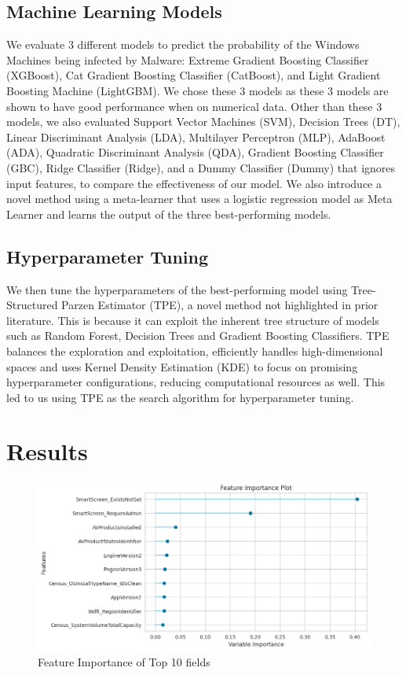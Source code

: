 \documentclass[pdflatex,sn-basic,Numbered]{sn-jnl}%
\theoremstyle{thmstyleone}%
\theoremstyle{thmstyletwo}%
\theoremstyle{thmstylethree}%
\begin{document}
\subsection{Machine Learning Models}\label{subsec:machine-learning-models}
We evaluate 3 different models to predict the probability of the Windows Machines being infected by Malware: Extreme Gradient Boosting Classifier (XGBoost), Cat Gradient Boosting Classifier (CatBoost), and Light Gradient Boosting Machine (LightGBM). We chose these 3 models as these 3 models are shown to have good performance when on numerical data.
Other than these 3 models, we also evaluated Support Vector Machines (SVM), Decision Trees (DT), Linear Discriminant Analysis (LDA), Multilayer Perceptron (MLP), AdaBoost (ADA), Quadratic Discriminant Analysis (QDA), Gradient Boosting Classifier (GBC), Ridge Classifier (Ridge), and a Dummy Classifier (Dummy) that ignores input features, to compare the effectiveness of our model.
We also introduce a novel method using a meta-learner that uses a logistic regression model as Meta Learner and learns the output of the three best-performing models.

\subsection{Hyperparameter Tuning}\label{subsec:hyperparameter-tuning}
We then tune the hyperparameters of the best-performing model using Tree-Structured Parzen Estimator (TPE), a novel method not highlighted in prior literature.
This is because it can exploit the inherent tree structure of models such as Random Forest, Decision Trees and Gradient Boosting Classifiers.
TPE balances the exploration and exploitation, efficiently handles high-dimensional spaces and uses Kernel Density Estimation (KDE) to focus on promising hyperparameter configurations, reducing computational resources as well.
This led to us using TPE as the search algorithm for hyperparameter tuning.

\section{Results}\label{sec:results}

\begin{figure}[!h]
\includegraphics[scale=0.5]{images/importance}
\centering
\caption{Feature Importance of Top 10 fields}
\label{fig:fig-3}
\end{figure}
\end{document}
